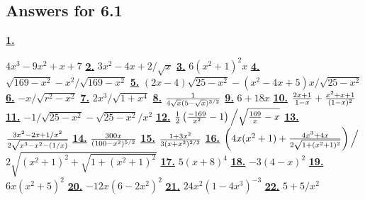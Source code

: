\subsection *{Answers for 6.1}
\hypertarget {a:6.1.1}{\hyperlink {e:6.1.1}{\bfseries 1.}} \mdseries $4x^3-9x^2+x+7$\qquad 
\hypertarget {a:6.1.2}{\hyperlink {e:6.1.2}{\bfseries 2.}} \mdseries $3x^2-4x+2/\sqrt {x}$\qquad 
\hypertarget {a:6.1.3}{\hyperlink {e:6.1.3}{\bfseries 3.}} \mdseries $6(x^2+1)^2x$\qquad 
\hypertarget {a:6.1.4}{\hyperlink {e:6.1.4}{\bfseries 4.}} \mdseries $\sqrt {169-x^2}-x^2/\sqrt {169-x^2}$\qquad 
\hypertarget {a:6.1.5}{\hyperlink {e:6.1.5}{\bfseries 5.}} \mdseries $ (2x-4)\sqrt {25-x^2}-$\hfill \break $(x^2-4x+5)x/\sqrt {25-x^2}$\qquad 
\hypertarget {a:6.1.6}{\hyperlink {e:6.1.6}{\bfseries 6.}} \mdseries $-x/\sqrt {r^2-x^2}$\qquad 
\hypertarget {a:6.1.7}{\hyperlink {e:6.1.7}{\bfseries 7.}} \mdseries $2x^3/\sqrt {1+x^4}$\qquad 
\hypertarget {a:6.1.8}{\hyperlink {e:6.1.8}{\bfseries 8.}} \mdseries ${1\over 4\sqrt {x}(5-\sqrt {x})^{3/2}}$\qquad 
\hypertarget {a:6.1.9}{\hyperlink {e:6.1.9}{\bfseries 9.}} \mdseries $ 6+18x$\qquad 
\hypertarget {a:6.1.10}{\hyperlink {e:6.1.10}{\bfseries 10.}} \mdseries ${2 x + 1\over 1 - x }+{x^2 + x + 1\over (1 - x)^2}$\qquad 
\hypertarget {a:6.1.11}{\hyperlink {e:6.1.11}{\bfseries 11.}} \mdseries $ -1/\sqrt {25-x^2}-\sqrt {25-x^2}/x^2$\qquad 
\hypertarget {a:6.1.12}{\hyperlink {e:6.1.12}{\bfseries 12.}} \mdseries ${1\over 2}\left ({-169\over x^2}-1\right )\Big /\sqrt {{169\over x}-x}$\qquad 
\hypertarget {a:6.1.13}{\hyperlink {e:6.1.13}{\bfseries 13.}} \mdseries $ {3x^2-2x+1/x^2\over 2\sqrt {x^3-x^2-(1/x)}}$\qquad 
\hypertarget {a:6.1.14}{\hyperlink {e:6.1.14}{\bfseries 14.}} \mdseries $ {300 x \over (100-x^2)^{5/2}}$\qquad 
\hypertarget {a:6.1.15}{\hyperlink {e:6.1.15}{\bfseries 15.}} \mdseries $ { 1 + 3 x^2\over 3(x+x^3)^{2/3}}$\qquad 
\hypertarget {a:6.1.16}{\hyperlink {e:6.1.16}{\bfseries 16.}} \mdseries $ \left (4x(x^2+1)+{4x^3+4x\over 2\sqrt {1+(x^2+1)^2}}\right )\Big /$ \hfill \break $2\sqrt {(x^2+1)^2+\sqrt {1+(x^2+1)^2}}$\qquad 
\hypertarget {a:6.1.17}{\hyperlink {e:6.1.17}{\bfseries 17.}} \mdseries $5(x+8)^4$\qquad 
\hypertarget {a:6.1.18}{\hyperlink {e:6.1.18}{\bfseries 18.}} \mdseries $-3(4-x)^2$\qquad 
\hypertarget {a:6.1.19}{\hyperlink {e:6.1.19}{\bfseries 19.}} \mdseries $6x(x^2+5)^2$\qquad 
\hypertarget {a:6.1.20}{\hyperlink {e:6.1.20}{\bfseries 20.}} \mdseries $-12x(6-2x^2)^2$\qquad 
\hypertarget {a:6.1.21}{\hyperlink {e:6.1.21}{\bfseries 21.}} \mdseries $24x^2(1-4x^3)^{-3}$\qquad 
\hypertarget {a:6.1.22}{\hyperlink {e:6.1.22}{\bfseries 22.}} \mdseries $5+5/x^2$\qquad 
